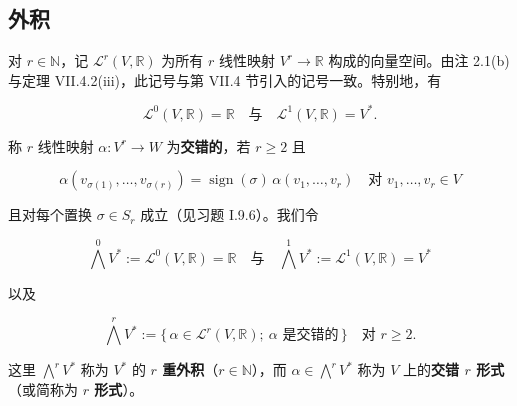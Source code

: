 \subsection*{外积}

对 $ r \in \mathbb{N} $，记 $ \mathcal{L}^{r}(V,\mathbb{R}) $ 为所有 $ r $ 线性映射 $ V^{r} \to \mathbb{R} $ 构成的向量空间。由注 2.1(b) 与定理 VII.4.2(iii)，此记号与第 VII.4 节引入的记号一致。特别地，有

\[
\mathcal{L}^{0}(V,\mathbb{R}) = \mathbb{R} \quad \text{与} \quad \mathcal{L}^{1}(V,\mathbb{R}) = V^{*}.
\]

称 $ r $ 线性映射 $ \alpha: V^{r} \to W $ 为\textbf{交错的}，若 $ r \ge 2 $ 且

\[
\alpha(v_{\sigma(1)},\ldots,v_{\sigma(r)}) = \operatorname{sign}(\sigma)\,\alpha(v_{1},\ldots,v_{r}) \quad \text{对 } v_{1},\ldots,v_{r} \in V
\]

且对每个置换 $ \sigma \in S_{r} $ 成立（见习题 I.9.6）。我们令

\[
\bigwedge^{0}V^{*} := \mathcal{L}^{0}(V,\mathbb{R}) = \mathbb{R} \quad \text{与} \quad \bigwedge^{1}V^{*} := \mathcal{L}^{1}(V,\mathbb{R}) = V^{*}
\]

以及

\[
\bigwedge^{r}V^{*} := \{\, \alpha \in \mathcal{L}^{r}(V,\mathbb{R}) ;\ \alpha \text{ 是交错的} \,\} \quad \text{对 } r \ge 2.
\]

这里 $ \bigwedge^{r}V^{*} $ 称为 $ V^{*} $ 的 \textbf{$ r $ 重外积}（$ r \in \mathbb{N} $），而 $ \alpha \in \bigwedge^{r}V^{*} $ 称为 $ V $ 上的\textbf{交错 $ r $ 形式}（或简称为 \textbf{$ r $ 形式}）。

